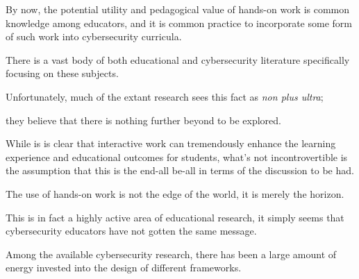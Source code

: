 







By now, the potential utility and pedagogical value of hands-on work is common knowledge among educators, and it is common practice to incorporate some form of such work into cybersecurity curricula. %







There is a vast body of both educational and cybersecurity literature specifically focusing on these subjects. %







Unfortunately, much of the extant research sees this fact as \emph{non plus ultra}; %







they believe that there is nothing further beyond to be explored. %







While is is clear that interactive work can tremendously enhance the learning experience and educational outcomes for students, what's not incontrovertible is the assumption that this is the end-all be-all in terms of the discussion to be had. %







The use of hands-on work is not the edge of the world, it is merely the horizon. %







This is in fact a highly active area of educational research, it simply seems that cybersecurity educators have not gotten the same message. 















Among the available cybersecurity research, there has been a large amount of energy invested into the design of different frameworks. %







